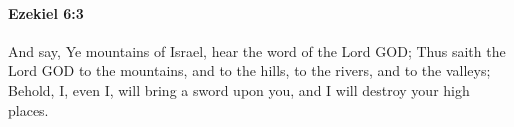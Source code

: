 
		\paragraph{Ezekiel 6:3} %
			\label{EZEKIEL-6-3}

			And say, Ye mountains of Israel, hear the word of the Lord GOD; Thus saith the Lord GOD to the mountains, and to the hills, to the rivers, and to the valleys; Behold, I, even I, will bring a sword upon you, and I will destroy your high places.


